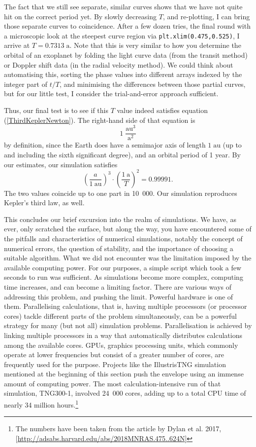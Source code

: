 \documentclass[twocolumn,apj]{openjournal}
\newcommand{\be}{\begin{equation}}
\newcommand{\ee}{\end{equation}}
\begin{document}
The fact that we still see separate, similar curves shows that we have not quite hit on the correct period yet. By slowly decreasing $T$, and re-plotting, I can bring those separate curves to coincidence. After a few dozen tries, the final round with a microscopic look at the steepest curve region via \verb|plt.xlim(0.475,0.525)|, I arrive at $T=0.7313\;\mbox{a}$. Note that this is very similar to how you determine the orbital of an exoplanet by folding the light curve data (from the transit method) or Doppler shift data (in the radial velocity method).
We could think about automatising this, sorting the phase values into different arrays indexed by the integer part of $t/T$, and minimising the differences between those partial curves, but for our little test, I consider the trial-and-error approach sufficient. 

Thus, our final test is to see if this $T$ value indeed satisfies equation (\ref{ThirdKeplerNewton}). The right-hand side of that equation is 
\be
1\;\frac{\mbox{au}^3}{\mbox{a}^2}
\ee
by definition, since the Earth does have a semimajor axis of length $1\;\mbox{au}$ (up to and including the sixth significant degree), and an orbital period of 1 year. By our estimates, our simulation satisfies
\be
\left(\frac{a}{1\:\mbox{au}}\right)^3\cdot\left(\frac{1\:\mbox{a}}{T}\right)^2 = 0.99991.
\ee
The two values coincide up to one part in 10~000. Our simulation reproduces Kepler's third law, as well. 

This concludes our brief excursion into the realm of simulations. We have, as ever, only scratched the surface, but along the way, you have encountered some of the pitfalls and characteristics of numerical simulations, notably the concept of numerical errors, the question of stability, and the importance of choosing a suitable algorithm. What we did not encounter was the limitation imposed by the available computing power. For our purposes, a simple script which took a few seconds to run was sufficient. As simulations become more complex, computing time increases, and can become a limiting factor. There are various ways of addressing this problem, and pushing the limit. Powerful hardware is one of them. Parallelising calculations, that is, having multiple processors (or processor cores) tackle different parts of the problem simultaneously, can be a powerful strategy for many (but not all) simulation problems. Parallelisation is achieved by linking multiple processors in a way that automatically distributes calculations among the available cores. GPUs, graphics processing units, which commonly operate at lower frequencies but consist of a greater number of cores, are frequently used for the purpose. Projects like the IllustrisTNG simulation mentioned at the beginning of this section push the envelope using an immense amount of computing power. The most calculation-intensive run of that simulation, TNG300-1, involved 24~000 cores, adding up to a total CPU time of nearly 34 million hours.\footnote{The numbers have been taken from the article by Dylan et al. 2017, [\href{http://adsabs.harvard.edu/abs/2018MNRAS.475..624N}{http://adsabs.harvard.edu/abs/2018MNRAS.475..624N}]}
\end{document}
